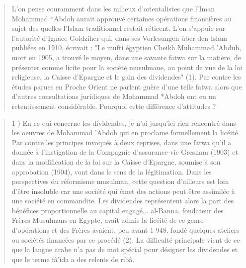 \cite{Jomier:AdbouCaisseEpargne}
\begin{quote}
    L'on pense couramment dans les milieux d'orientalistes que l'Iman
Mohammad *Abdoh aurait approuvé certaines opérations financières au sujet des
quelles l'Islam traditionnel restait réticent. L'on s'appuie sur l'autorité d'Ignace
Goldziher qui, dans ses Vorlesungen ùber den Islam publiées en 1910, écrivait :
"Le mufti égyptien Cheikh Muhammad 'Abduh, mort en 1905, a trouvé le
moyen, dans une savante fatwa sur la matière, de présenter comme licite pour la
société musulmane, au point de vue de la loi religieuse, la Caisse d'Epargne et le
gain des dividendes" (1).
Par contre les études parues en Proche Orient ne parlent guère d'une telle
fatwa alors que d'autres consultations juridiques de Mohammad *Abdoh ont eu un
retentissement considérable. Pourquoi cette différence d'attitudes ?
\end{quote}

\begin{quote}
    1 ) En ce qui concerne les dividendes, je n'ai jusqu'ici rien rencontré dans les
oeuvres de Mohammad 'Abdoh qui en proclame formellement la licéité. Par contre
les principes invoqués à deux reprises, dans une fatwa qu'il a donnée à
l'instigation de la Compagnie d'assurance-vie Gresham (1903) et dans la
modification de la loi sur la Caisse d'Epargne, soumise à son approbation (1904), vont
dans le sens de la légitimation. Dans les perspectives du réformisme musulman,
cette question d'ailleurs est loin d'être insoluble car une société qui émet des
actions peut être assimilée à une société en commandite. Les dividendes
représentent alors la part des bénéfices proportionnelle au capital engagé... 
al-Banna, fondateur des Frères Musulmans en Egypte, avait admis la licéité de ce
genre d'opérations et des Frères avaient, peu avant 1 948, fondé quelques ateliers
ou sociétés financées par ce procédé (2). La difficulté principale vient de ce que la
langue arabe n'a pas de mot spécial pour désigner les dividendes et que le terme
fâ'ida a des relents de ribâ.
\end{quote}

